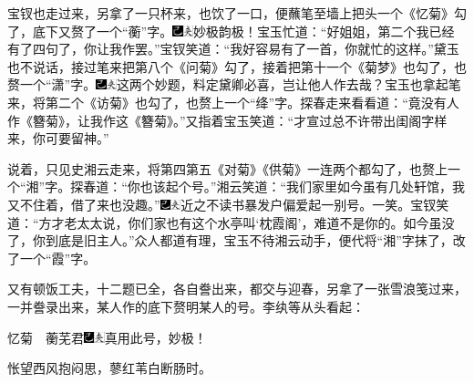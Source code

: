 宝钗也走过来，另拿了一只杯来，也饮了一口，便蘸笔至墙上把头一个《忆菊》勾了，底下又赘了一个“蘅”字。{\includegraphics[width=3mm]{../Images/00003}\includegraphics[width=3mm]{../Images/00012}\footnotesize \kaishu 妙极韵极！}宝玉忙道：“好姐姐，第二个我已经有了四句了，你让我作罢。”宝钗笑道：“我好容易有了一首，你就忙的这样。”黛玉也不说话，接过笔来把第八个《问菊》勾了，接着把第十一个《菊梦》也勾了，也赘一个“潇”字。{\includegraphics[width=3mm]{../Images/00003}\includegraphics[width=3mm]{../Images/00012}\footnotesize \kaishu 这两个妙题，料定黛卿必喜，岂让他人作去哉？}宝玉也拿起笔来，将第二个《访菊》也勾了，也赘上一个“绛”字。探春走来看看道：“竟没有人作《簪菊》，让我作这《簪菊》。”又指着宝玉笑道：“才宣过总不许带出闺阁字样来，你可要留神。”

说着，只见史湘云走来，将第四第五《对菊》《供菊》一连两个都勾了，也赘上一个“湘”字。探春道：“你也该起个号。”湘云笑道：“我们家里如今虽有几处轩馆，我又不住着，借了来也没趣。”{\includegraphics[width=3mm]{../Images/00003}\includegraphics[width=3mm]{../Images/00012}\footnotesize \kaishu 近之不读书暴发户偏爱起一别号。一笑。}宝钗笑道：“方才老太太说，你们家也有这个水亭叫‘枕霞阁’，难道不是你的。如今虽没了，你到底是旧主人。”众人都道有理，宝玉不待湘云动手，便代将“湘”字抹了，改了一个“霞”字。

又有顿饭工夫，十二题已全，各自誊出来，都交与迎春，另拿了一张雪浪笺过来，一并誊录出来，某人作的底下赘明某人的号。李纨等从头看起：

忆菊　蘅芜君{\includegraphics[width=3mm]{../Images/00003}\includegraphics[width=3mm]{../Images/00012}\footnotesize \kaishu 真用此号，妙极！}

怅望西风抱闷思，蓼红苇白断肠时。

